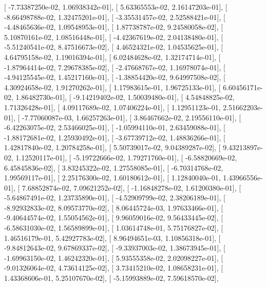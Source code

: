 \documentclass{article}
\begin{document}
       [ -7.73387250e-02,   1.06938342e-01],
       [  5.63365553e-02,   2.16147203e-01],
       [ -8.66498788e-02,   1.32475201e-01],
       [ -3.35531457e-02,   2.52588421e-01],
       [ -4.48465636e-02,   1.09548953e-01],
       [  1.87738787e-02,   9.24580058e-02],
       [  5.10870161e-02,   1.08516448e-01],
       [ -4.42367619e-02,   2.04138480e-01],
       [ -5.51240541e-02,   8.47516673e-02],
       [  4.46524321e-02,   1.04535625e-01],
       [  4.64795158e-02,   1.19016394e-01],
       [  6.02484628e-02,   1.32174714e-01],
       [ -1.87964414e-02,   7.29678385e-02],
       [ -2.47668767e-02,   1.16978074e-01],
       [ -4.94125545e-02,   1.45217160e-01],
       [ -1.38854420e-02,   9.64997508e-02],
       [  4.30924658e-02,   1.91270262e-01],
       [  1.17983615e-01,   1.96725133e-01],
       [  6.60456171e-02,   1.86482730e-01],
       [ -9.14219402e-02,   1.50039480e-01],
       [  4.54848825e-02,   1.71326428e-01],
       [  4.09117689e-02,   1.07406224e-01],
       [  1.12951123e-01,   2.51662203e-01],
       [ -7.77060087e-03,   1.66257263e-01],
       [  3.86467662e-02,   2.19556110e-01],
       [ -6.42263075e-02,   2.53466025e-01],
       [ -1.05994110e-01,   2.63459088e-01],
       [ -1.88172681e-02,   1.25930492e-01],
       [ -3.67739712e-02,   1.48836266e-01],
       [  1.42817840e-02,   1.20784258e-01],
       [  5.50739017e-02,   9.04389287e-02],
       [  9.43213897e-02,   1.12520117e-01],
       [ -5.19722666e-02,   1.79271760e-01],
       [ -6.58820669e-02,   6.45845836e-02],
       [  3.83245322e-02,   1.27558085e-01],
       [ -6.70314768e-02,   1.99569117e-01],
       [  2.25176300e-02,   1.60180612e-01],
       [  1.12840040e-01,   1.43966556e-01],
       [  7.68852874e-02,   7.09621252e-02],
       [ -1.16848278e-02,   1.61200380e-01],
       [ -5.64867491e-02,   1.23735890e-01],
       [ -4.52909799e-02,   2.38206189e-01],
       [ -8.92932833e-02,   8.09573770e-02],
       [  8.06445724e-03,   1.97633466e-01],
       [ -9.40644574e-02,   1.55054562e-01],
       [  9.96059016e-02,   9.56433445e-02],
       [ -6.58631030e-02,   1.56589899e-01],
       [  1.03614748e-01,   5.75176827e-02],
       [  1.46516179e-01,   5.42927783e-02],
       [  8.96494651e-03,   1.10856318e-01],
       [ -9.84812643e-02,   9.67869337e-02],
       [ -9.33937003e-02,   1.38673945e-01],
       [ -1.69963150e-02,   1.46242320e-01],
       [  5.93555358e-02,   2.02098227e-01],
       [ -9.01326064e-02,   4.73614125e-02],
       [  3.73415210e-02,   1.08658231e-01],
       [  1.43368606e-01,   5.25107670e-02],
       [ -5.15993889e-02,   7.59618570e-02],
\end{document}
